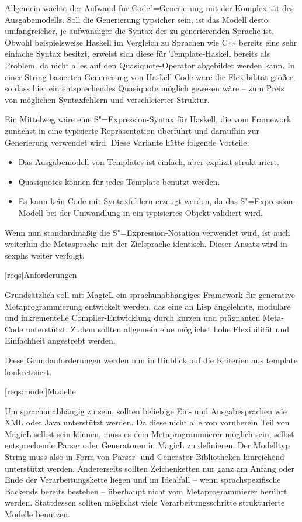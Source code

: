 \documentclass[12pt, a4paper, bibgerm]{scrbook}
\newcommand\lchapter{}
\newcommand\lsection{}
\newcommand\cref{}
\newcommand{\sexp}{S"=Expression}
\newcommand{\cgen}{Code"=Generierung}
\newcommand{\mprog}{Metaprogrammierung}
\newcommand{\cpp}{C\texttt{++}}
\begin{document}
Allgemein wächst der Aufwand für \cgen{} mit der Komplexität des
Ausgabemodells. Soll die Generierung typsicher sein, ist das Modell
desto umfangreicher, je aufwändiger die Syntax der zu generierenden
Sprache ist. Obwohl beispielsweise Haskell im Vergleich zu Sprachen wie
\cpp{} bereits eine sehr einfache Syntax besitzt, erweist sich diese für
Template-Haskell bereits als Problem, da nicht alles auf den
Quasiquote-Operator abgebildet werden kann. In einer String-basierten
Generierung von Haskell-Code wäre die Flexibilität größer, so dass hier
ein entsprechendes Quasiquote möglich gewesen wäre -- zum Preis von
möglichen Syntaxfehlern und verschleierter Struktur.

Ein Mittelweg wäre eine \sexp{}-Syntax für Haskell, die vom Framework
zunächst in eine typisierte Repräsentation überführt und daraufhin zur
Generierung verwendet wird. Diese Variante hätte folgende Vorteile:
\begin{itemize}
\item Das Ausgabemodell von Templates ist einfach, aber explizit
  strukturiert.
\item Quasiquotes können für jedes Template benutzt werden.
\item Es kann kein Code mit Syntaxfehlern erzeugt werden, da das
  \sexp{}-Modell bei der Umwandlung in ein typisiertes Objekt
  validiert wird.
\end{itemize}
Wenn nun standardmäßig die \sexp{}-Notation verwendet wird, ist auch
weiterhin die Metasprache mit der Zielsprache identisch. Dieser Ansatz
wird in \cref{sexphs} weiter verfolgt.

\lchapter[reqs]{Anforderungen}

Grundsätzlich soll mit MagicL ein sprachunabhängiges Framework für
generative \mprog{} entwickelt werden, das eine an Lisp angelehnte,
modulare und inkrementelle Compiler-Entwicklung durch kurzen und
prägnanten Meta-Code unterstützt. Zudem sollten allgemein eine möglichst
hohe Flexibilität und Einfachheit angestrebt werden.

Diese Grundanforderungen werden nun in Hinblick auf die Kriterien aus
\cref{template} konkretisiert.

\lsection[reqs:model]{Modelle}

Um sprachunabhängig zu sein, sollten beliebige Ein- und Ausgabesprachen
wie XML oder Java unterstützt werden. Da diese nicht alle von vornherein
Teil von MagicL selbst sein können, muss es dem Metaprogrammierer
möglich sein, selbst entsprechende Parser oder Generatoren in MagicL zu
definieren. Der Modelltyp String muss also in Form von Parser- und
Generator-Bibliotheken hinreichend unterstützt werden. Andererseits
sollten Zeichenketten nur ganz am Anfang oder Ende der
Verarbeitungskette liegen und im Idealfall -- wenn sprachspezifische
Backends bereits bestehen -- überhaupt nicht vom Metaprogrammierer
berührt werden. Stattdessen sollten möglichst viele
Verarbeitungsschritte strukturierte Modelle benutzen. 
\end{document}
